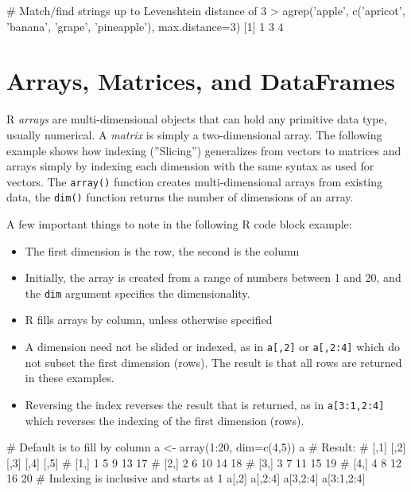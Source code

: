 \begin{Rcode}
# Match/find strings up to Levenshtein distance of 3
> agrep('apple', 
    c('apricot', 'banana', 'grape', 'pineapple'), 
    max.distance=3)
[1] 1 3 4
\end{Rcode}

\section{Arrays, Matrices, and DataFrames}

R \emph{arrays} are multi-dimensional objects that can hold any primitive data type, usually numerical. A \emph{matrix} is simply a two-dimensional array. The following example shows how indexing (''Slicing'') generalizes from vectors to matrices and arrays simply by indexing each dimension with the same syntax as used for vectors. The \texttt{array()} function creates multi-dimensional arrays from existing data, the \texttt{dim()} function returns the number of dimensions of an array.

A few important things to note in the following R code block example:
\begin{itemize}
   \item The first dimension is the row, the second is the column
   \item Initially, the array is created from a range of numbers between 1 and 20, and the \texttt{dim} argument specifies the dimensionality. 
   \item R fills arrays by column, unless otherwise specified
   \item A dimension need not be slided or indexed, as in \texttt{a[,2]} or \texttt{a[,2:4]} which do not subset the first dimension (rows). The result is that all rows are returned in these examples. 
   \item Reversing the index reverses the result that is returned, as in \texttt{a[3:1,2:4]} which reverses the indexing of the first dimension (rows). 
\end{itemize}

\begin{Rcode}
# Default is to fill by column
a <- array(1:20, dim=c(4,5))
a
# Result:
#      [,1] [,2] [,3] [,4] [,5]
# [1,]    1    5    9   13   17
# [2,]    2    6   10   14   18
# [3,]    3    7   11   15   19
# [4,]    4    8   12   16   20
# Indexing is inclusive and starts at 1
a[,2]
a[,2:4]
a[3,2:4]
a[3:1,2:4]
\end{Rcode}

